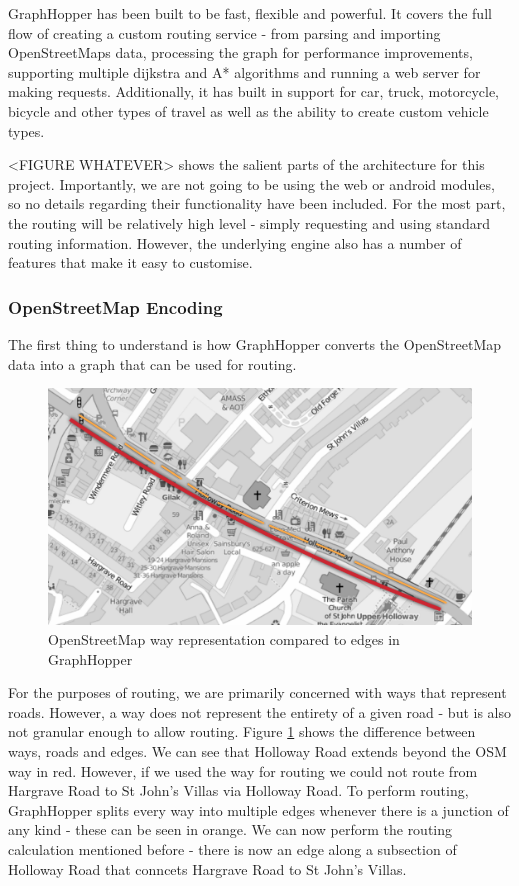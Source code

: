 \documentclass[ draft,
                    author={Alexander Hill},
                supervisor={Dr. Benjamin Sach},
                    degree={MEng},
                     title={MARMOSET: Multi Agent Real-time Multi-core Online
                     Simulation for Efficient Transportation},
                  subtitle={},
                      type={research},
                      year={2016} ]{dissertation}
\begin{document}
GraphHopper has been built to be fast, flexible and powerful. It covers the full
flow of creating a custom routing service - from parsing and importing
OpenStreetMaps data, processing the graph for performance improvements,
supporting multiple dijkstra and A* algorithms and running a web server for
making requests. Additionally, it has built in support for car, truck,
motorcycle, bicycle and other types of travel as well as the ability to create
custom vehicle types.

<FIGURE WHATEVER> shows the salient parts of the architecture for this project.
Importantly, we are not going to be using the web or android modules, so no
details regarding their functionality have been included. For the most part, the
routing will be relatively high level - simply requesting and using standard
routing information. However, the underlying engine also has a number of
features that make it easy to customise.

\subsubsection{OpenStreetMap Encoding}

The first thing to understand is how GraphHopper converts the OpenStreetMap data
into a graph that can be used for routing.

\begin{figure}[t]
    \centering
    \includegraphics[scale=0.6]{osm-gh}
    \caption{OpenStreetMap way representation compared to edges in GraphHopper}\label{osm-gh-img}
\end{figure}

For the purposes of routing, we are primarily concerned with ways that represent
roads. However, a way does not represent the entirety of a given road - but is
also not granular enough to allow routing. Figure \ref{osm-gh-img} shows the
difference between ways, roads and edges. We can see that Holloway Road extends
beyond the OSM way in red. However, if we used the way for routing we could not
route from Hargrave Road to St John's Villas via Holloway Road. To perform
routing, GraphHopper splits every way into multiple edges whenever there is a
junction of any kind - these can be seen in orange. We can now perform the
routing calculation mentioned before - there is now an edge along a subsection of
Holloway Road that conncets Hargrave Road to St John's Villas.
\end{document}
